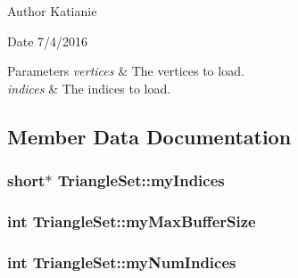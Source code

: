 \begin{DoxyAuthor}{Author}
Katianie 
\end{DoxyAuthor}
\begin{DoxyDate}{Date}
7/4/2016
\end{DoxyDate}

\begin{DoxyParams}{Parameters}
{\em vertices} & The vertices to load. \\
\hline
{\em indices} & The indices to load. \\
\hline
\end{DoxyParams}


\subsection{Member Data Documentation}
\subsubsection[{\texorpdfstring{my\+Indices}{myIndices}}]{\setlength{\rightskip}{0pt plus 5cm}short$\ast$ Triangle\+Set\+::my\+Indices\hspace{0.3cm}{\ttfamily [protected]}}\hypertarget{class_triangle_set_a3685b9957ee6383120d5b38407cb731d}{}\label{class_triangle_set_a3685b9957ee6383120d5b38407cb731d}
\subsubsection[{\texorpdfstring{my\+Max\+Buffer\+Size}{myMaxBufferSize}}]{\setlength{\rightskip}{0pt plus 5cm}int Triangle\+Set\+::my\+Max\+Buffer\+Size\hspace{0.3cm}{\ttfamily [protected]}}\hypertarget{class_triangle_set_a5438cf58a0180a411634bba22d0bc829}{}\label{class_triangle_set_a5438cf58a0180a411634bba22d0bc829}
\subsubsection[{\texorpdfstring{my\+Num\+Indices}{myNumIndices}}]{\setlength{\rightskip}{0pt plus 5cm}int Triangle\+Set\+::my\+Num\+Indices\hspace{0.3cm}{\ttfamily [protected]}}\hypertarget{class_triangle_set_a0c4ae28e04e40ca53e37ef2579069f92}{}\label{class_triangle_set_a0c4ae28e04e40ca53e37ef2579069f92}
